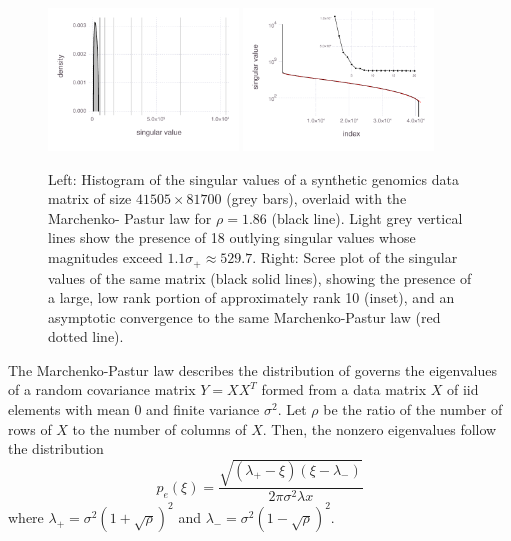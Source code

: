 \documentclass[review]{siamart0516}
\begin{document}
\begin{figure}

\includegraphics[width=0.45\textwidth]{fig/synthetic/fig-empirical-density}
%
\includegraphics[width=0.45\textwidth]{fig/synthetic/fig-empirical-scree}

\caption{Left: Histogram of the singular values of a synthetic genomics data
matrix of size $41505\times81700$ (grey bars), overlaid with the Marchenko-
Pastur law for $\rho = 1.86$ (black line). Light grey vertical lines show the
presence of 18 outlying singular values whose magnitudes exceed
$1.1\sigma_+ \approx 529.7$.
Right: Scree plot of the singular values of the same matrix
(black solid lines), showing the presence of a large, low rank portion
of approximately rank 10 (inset), and an asymptotic convergence to the same
Marchenko-Pastur law (red dotted line).}
\label{fig:empirical-spectrum}
\end{figure}


The Marchenko-Pastur law describes the distribution of governs the eigenvalues
of a random covariance matrix $Y=XX^T$ formed from a data matrix $X$
of iid elements with mean 0 and finite variance $\sigma^2$.
Let $\rho$ be the ratio of the number of rows of $X$ to the number of columns of
$X$. Then, the nonzero eigenvalues follow the distribution
%
\begin{equation}
    p_e(\xi) = \frac {\sqrt{(\lambda_+-\xi)(\xi-\lambda_-)}} {2 \pi \sigma^2 \lambda x}
\end{equation}
%
where
$\lambda_+ = \sigma^2(1+\sqrt{\rho})^2$ and
$\lambda_- = \sigma^2(1-\sqrt{\rho})^2$.
\end{document}
